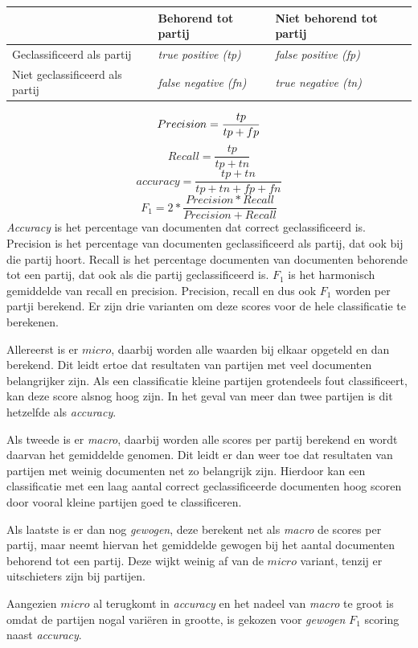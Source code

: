 \begin{table}[H]
\label{tab:scores}
\centering
\begin{tabular}{l|l|l}
 & Behorend tot partij & Niet behorend tot partij\\ \hline
Geclassificeerd als partij &   \textit{true positive (tp)} & \textit{false positive (fp)} \\ \hline
Niet geclassificeerd als partij & \textit{false negative (fn)} & \textit{true negative (tn)} \\
\end{tabular}
\end{table}
\begin{equation}
    Precision = \frac{tp}{tp + fp}\\
\end{equation}
\begin{equation}
    Recall = \frac{tp}{tp + tn}
\end{equation}
\begin{equation}
    accuracy = \frac{tp + tn}{tp + tn + fp + fn}
\end{equation}
\begin{equation}
    F_1 = 2 * \frac{Precision * Recall}{Precision + Recall}
\end{equation}
\textit{Accuracy} is het percentage van documenten dat correct geclassificeerd is. Precision is het percentage van documenten geclassificeerd als partij, dat ook bij die partij hoort. Recall is het percentage documenten van documenten behorende tot een partij, dat ook als die partij geclassificeerd is. $F_1$ is het harmonisch gemiddelde van recall en precision. Precision, recall en dus ook $F_1$ worden per partji berekend. Er zijn drie varianten om deze scores voor de hele classificatie te berekenen. \par
Allereerst is er $micro$, daarbij worden alle waarden bij elkaar opgeteld en dan berekend. Dit leidt ertoe dat resultaten van partijen met veel documenten belangrijker zijn. Als een classificatie kleine partijen grotendeels fout classificeert, kan deze score alsnog hoog zijn. In het geval van meer dan twee partijen is dit hetzelfde als \textit{accuracy}.\par 
Als tweede is er \textit{macro}, daarbij worden alle scores per partij berekend en wordt daarvan het gemiddelde genomen. Dit leidt er dan weer toe dat resultaten van partijen met weinig documenten net zo belangrijk zijn. Hierdoor kan een classificatie met een laag aantal correct geclassificeerde documenten hoog scoren door vooral kleine partijen goed te classificeren.\par
Als laatste is er dan nog \textit{gewogen}, deze berekent net als \textit{macro} de scores per partij, maar neemt hiervan het gemiddelde gewogen bij het aantal documenten behorend tot een partij. Deze wijkt weinig af van de $micro$ variant, tenzij er uitschieters zijn bij partijen.\par
Aangezien $micro$ al terugkomt in \textit{accuracy} en het nadeel van \textit{macro} te groot is omdat de partijen nogal variëren in grootte, is gekozen voor \textit{gewogen} $F_1$ scoring naast \textit{accuracy}.
\bigskip


